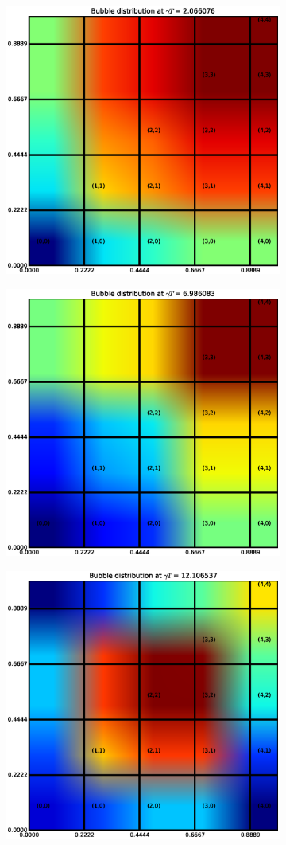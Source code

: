 \begin{figure}
\begin{subfigure}[b]{0.66\columnwidth}
  \includegraphics[width=0.66\columnwidth]{figs/spatial_bubble-1}
\end{subfigure}
\begin{subfigure}[b]{0.66\columnwidth}
  \includegraphics[width=0.66\columnwidth]{figs/spatial_bubble-17}
\end{subfigure}
\begin{subfigure}[b]{0.66\columnwidth}
  \includegraphics[width=0.66\columnwidth]{figs/spatial_bubble-59}

\end{subfigure}
\end{figure}

